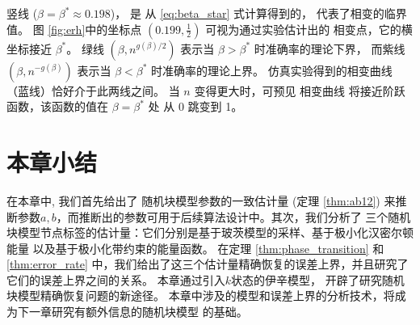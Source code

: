 竖线 ($\beta=\beta^* \approx 0.198$)，
是 从 \eqref{eq:beta_star} 式计算得到的， 
代表了相变的临界值。
图 \ref{fig:erh}中的坐标点 $(0.199,\frac{1}{2})$
可视为通过实验估计出的
相变点，它的横坐标接近
$\beta^*$。
绿线 $(\beta, n^{g(\beta)/2})$ 
表示当 $\beta>\beta^*$ 时准确率的理论下界，
而紫线
$(\beta, n^{-g(\beta)})$ 
表示当 $\beta<\beta^*$ 时准确率的理论上界。
仿真实验得到的相变曲线（蓝线）恰好介于此两线之间。
当 $n$ 变得更大时，可预见
相变曲线 将接近阶跃函数，该函数的值在
$\beta=\beta^*$ 处
从 0 跳变到 1。
\section{本章小结}
在本章中, 
我们首先给出了 随机块模型参数的一致估计量 (定理 \ref{thm:ab12}) 
来推断参数$a,b$，而推断出的参数可用于后续算法设计中。其次，我们分析了
三个随机块模型节点标签的估计量：它们分别是基于玻茨模型的采样、基于极小化汉密尔顿能量
以及基于极小化带约束的能量函数。
在定理 \ref{thm:phase_transition} 和 \ref{thm:error_rate}
中，我们给出了这三个估计量精确恢复的误差上界，并且研究了它们的误差上界之间的关系。
本章通过引入$k$状态的伊辛模型，
开辟了研究随机块模型精确恢复问题的新途径。
本章中涉及的模型和误差上界的分析技术，将成为下一章研究有额外信息的随机块模型
的基础。

